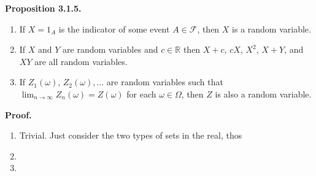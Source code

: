 \documentclass{article}
\begin{document}
\medskip

\noindent \textbf{Proposition 3.1.5.} 

\begin{enumerate}

\item If $X = 1_A$ is the indicator of some event $A \in \mathcal{F}$, then $X$ is a random variable.

\item If $X$ and $Y$ are random variables and $c \in \mathbb{R}$ then $X + c$, $cX$, $X^2$, $X+Y$, and $XY$ are all random variables.

\item If $Z_1(\omega)$, $Z_2(\omega),...$ are random variables such that $\lim_{n \to \infty} Z_n(\omega)  = Z(\omega)$ for each $\omega \in \Omega$, then $Z$ is also a random variable. 

\end{enumerate}  


\medskip

\noindent \textbf{Proof.} 

\begin{enumerate}

\item Trivial. Just consider the two types of sets in the real, thos

\item 

\item 

\end{enumerate}
\end{document}

